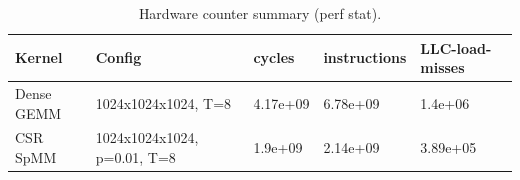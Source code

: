 \begin{table}[H]
\centering
\caption{Hardware counter summary (perf stat).}
\label{tab:perf_counters}
\begin{tabular}{lllll}
\toprule
Kernel & Config & cycles & instructions & LLC-load-misses \\
\midrule
Dense GEMM & 1024x1024x1024, T=8 & 4.17e+09 & 6.78e+09 & 1.4e+06 \\
CSR SpMM & 1024x1024x1024, p=0.01, T=8 & 1.9e+09 & 2.14e+09 & 3.89e+05 \\
\bottomrule
\end{tabular}
\end{table}
